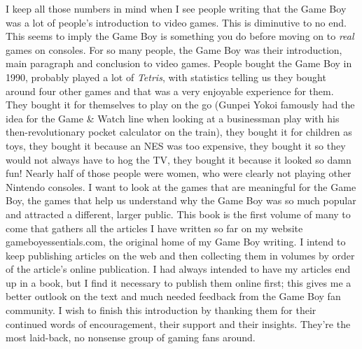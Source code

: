 \documentclass{book}
\begin{document}
I keep all those numbers in mind when I see people writing that the Game Boy was a lot of people’s introduction to video games. This is diminutive to no end. This seems to imply the Game Boy is something you do before moving on to \emph{real} games on consoles. For so many people, the Game Boy was their introduction, main paragraph and conclusion to video games. People bought the Game Boy in 1990, probably played a lot of \emph{Tetris}, with statistics telling us they bought around four other games and that was a very enjoyable experience for them. They bought it for themselves to play on the go (Gunpei Yokoi famously had the idea for the Game \& Watch line when looking at a businessman play with his then-revolutionary pocket calculator on the train), they bought it for children as toys, they bought it because an NES was too expensive, they bought it so they would not always have to hog the TV, they bought it because it looked so damn fun! Nearly half of those people were women, who were clearly not playing other Nintendo consoles. I want to look at the games that are meaningful for the Game Boy, the games that help us understand why the Game Boy was so much popular and attracted a different, larger public.
This book is the first volume of many to come that gathers all the articles I have written so far on my website gameboyessentials.com, the original home of my Game Boy writing. I intend to keep publishing articles on the web and then collecting them in volumes by order of the article’s online publication. I had always intended to have my articles end up in a book, but I find it necessary to publish them online first; this gives me a better outlook on the text and much needed feedback from the Game Boy fan community. I wish to finish this introduction by thanking them for their continued words of encouragement, their support and their insights. They’re the most laid-back, no nonsense group of gaming fans around.\par
\end{document}
